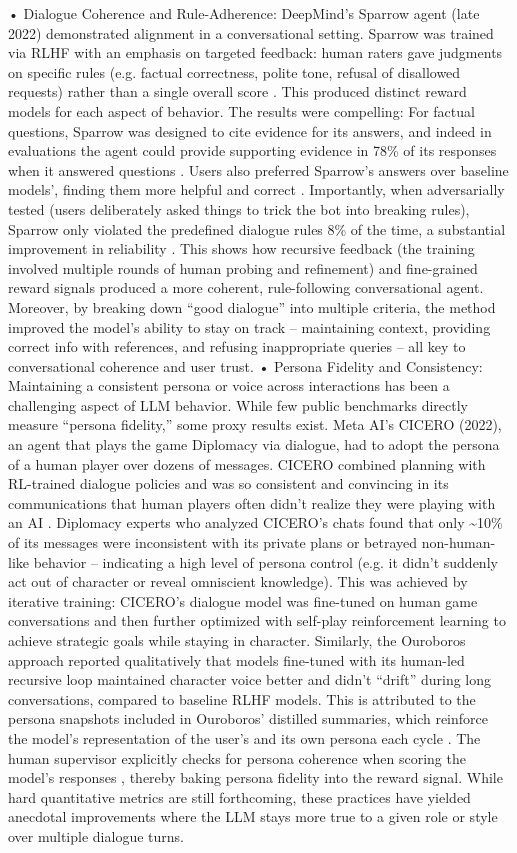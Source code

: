 \documentclass{article}
\begin{document}
	•	Dialogue Coherence and Rule-Adherence: DeepMind’s Sparrow agent (late 2022) demonstrated alignment in a conversational setting. Sparrow was trained via RLHF with an emphasis on targeted feedback: human raters gave judgments on specific rules (e.g. factual correctness, polite tone, refusal of disallowed requests) rather than a single overall score . This produced distinct reward models for each aspect of behavior. The results were compelling: For factual questions, Sparrow was designed to cite evidence for its answers, and indeed in evaluations the agent could provide supporting evidence in 78\% of its responses when it answered questions . Users also preferred Sparrow’s answers over baseline models’, finding them more helpful and correct . Importantly, when adversarially tested (users deliberately asked things to trick the bot into breaking rules), Sparrow only violated the predefined dialogue rules 8\% of the time, a substantial improvement in reliability . This shows how recursive feedback (the training involved multiple rounds of human probing and refinement) and fine-grained reward signals produced a more coherent, rule-following conversational agent. Moreover, by breaking down “good dialogue” into multiple criteria, the method improved the model’s ability to stay on track – maintaining context, providing correct info with references, and refusing inappropriate queries – all key to conversational coherence and user trust.
	•	Persona Fidelity and Consistency: Maintaining a consistent persona or voice across interactions has been a challenging aspect of LLM behavior. While few public benchmarks directly measure “persona fidelity,” some proxy results exist. Meta AI’s CICERO (2022), an agent that plays the game Diplomacy via dialogue, had to adopt the persona of a human player over dozens of messages. CICERO combined planning with RL-trained dialogue policies and was so consistent and convincing in its communications that human players often didn’t realize they were playing with an AI . Diplomacy experts who analyzed CICERO’s chats found that only \textasciitilde{}10\% of its messages were inconsistent with its private plans or betrayed non-human-like behavior  – indicating a high level of persona control (e.g. it didn’t suddenly act out of character or reveal omniscient knowledge). This was achieved by iterative training: CICERO’s dialogue model was fine-tuned on human game conversations and then further optimized with self-play reinforcement learning to achieve strategic goals while staying in character. Similarly, the Ouroboros approach reported qualitatively that models fine-tuned with its human-led recursive loop maintained character voice better and didn’t “drift” during long conversations, compared to baseline RLHF models. This is attributed to the persona snapshots included in Ouroboros’ distilled summaries, which reinforce the model’s representation of the user’s and its own persona each cycle . The human supervisor explicitly checks for persona coherence when scoring the model’s responses  , thereby baking persona fidelity into the reward signal. While hard quantitative metrics are still forthcoming, these practices have yielded anecdotal improvements where the LLM stays more true to a given role or style over multiple dialogue turns.
\end{document}
